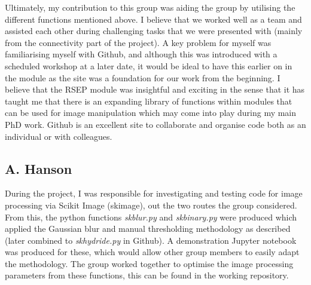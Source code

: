 \documentclass{article}
\begin{document}
Ultimately, my contribution to this group was aiding the group by utilising the different functions mentioned above. I believe that we worked well as a team and assisted each other during challenging tasks that we were presented with (mainly from the connectivity part of the project). A key problem for myself was familiarising myself with Github, and although this was introduced with a scheduled workshop at a later date, it would be ideal to have this earlier on in the module as the site was a foundation for our work from the beginning. I believe that the RSEP module was insightful and exciting in the sense that it has taught me that there is an expanding library of functions within modules that can be used for image manipulation which may come into play during my main PhD work. Github is an excellent site to collaborate and organise code both as an individual or with colleagues.

\subsection{A. Hanson}
During the project, I was responsible for investigating and testing code for image processing via Scikit Image (skimage), out the two routes the group considered. From this, the python functions \textit{skblur.py} and \textit{skbinary.py} were produced which applied the Gaussian blur and manual thresholding methodology as described (later combined to \textit{skhydride.py} in Github). A demonstration Jupyter notebook was produced for these, which would allow other group members to easily adapt the methodology. The group worked together to optimise the image processing parameters from these functions, this can be found in the working repository.
\end{document}
